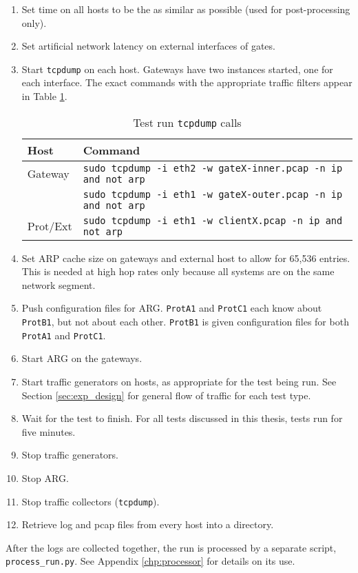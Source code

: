 \begin{enumerate}
\item Set time on all hosts to be the as similar as possible (used for post-processing only).
\item Set artificial network latency on external interfaces of gates.
\item Start \texttt{tcpdump} on each host. Gateways have two instances started, one for each interface. The exact commands with the appropriate traffic filters appear in Table \ref{tbl:test_tcpdump_calls}.
\begin{table}
\caption{Test run \texttt{tcpdump} calls}
\label{tbl:test_tcpdump_calls}
\centering
\begin{tabular}{l|l}
Host & Command\\
\hline
Gateway & \texttt{sudo tcpdump -i eth2 -w gateX-inner.pcap -n ip and not arp}\\
	& \texttt{sudo tcpdump -i eth1 -w gateX-outer.pcap -n ip and not arp}\\
\hline
Prot/Ext & \texttt{sudo tcpdump -i eth1 -w clientX.pcap -n ip and not arp}
\end{tabular}
\end{table}

\item Set \ac{ARP} cache size on gateways and external host to allow for 65,536 entries. This is needed at high hop rates only because all systems are on the same network segment.
\item Push configuration files for \ac{ARG}. \texttt{ProtA1} and \texttt{ProtC1} each know about \texttt{ProtB1}, but not about each other. \texttt{ProtB1} is given configuration files for both \texttt{ProtA1} and \texttt{ProtC1}.
\item Start \ac{ARG} on the gateways. 
\item Start traffic generators on hosts, as appropriate for the test being run. See Section \ref{sec:exp_design} for general flow of traffic for each test type.
\item Wait for the test to finish. For all tests discussed in this thesis, tests run for five minutes.
\item Stop traffic generators.
\item Stop \ac{ARG}.
\item Stop traffic collectors (\texttt{tcpdump}).
\item Retrieve log and pcap files from every host into a directory.
\end{enumerate}

\par After the logs are collected together, the run is processed by a separate script, \texttt{process\_run.py}. See Appendix \ref{chp:processor} for details on its use. 

